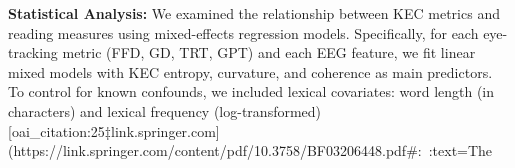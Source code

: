 \textbf{Statistical Analysis:} We examined the relationship between KEC metrics and reading measures using mixed-effects regression models. Specifically, for each eye-tracking metric (FFD, GD, TRT, GPT) and each EEG feature, we fit linear mixed models with KEC entropy, curvature, and coherence as main predictors. To control for known confounds, we included lexical covariates: word length (in characters) and lexical frequency (log-transformed) [oai_citation:25‡link.springer.com](https://link.springer.com/content/pdf/10.3758/BF03206448.pdf#:~:text=The%

